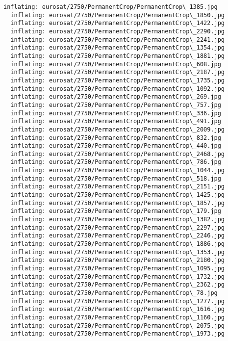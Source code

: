 \documentclass[11pt]{article}
\begin{document}
\begin{Verbatim}[commandchars=\\\{\}]
  inflating: eurosat/2750/PermanentCrop/PermanentCrop\_1385.jpg
  inflating: eurosat/2750/PermanentCrop/PermanentCrop\_1850.jpg
  inflating: eurosat/2750/PermanentCrop/PermanentCrop\_1422.jpg
  inflating: eurosat/2750/PermanentCrop/PermanentCrop\_2290.jpg
  inflating: eurosat/2750/PermanentCrop/PermanentCrop\_2241.jpg
  inflating: eurosat/2750/PermanentCrop/PermanentCrop\_1354.jpg
  inflating: eurosat/2750/PermanentCrop/PermanentCrop\_1881.jpg
  inflating: eurosat/2750/PermanentCrop/PermanentCrop\_608.jpg
  inflating: eurosat/2750/PermanentCrop/PermanentCrop\_2187.jpg
  inflating: eurosat/2750/PermanentCrop/PermanentCrop\_1735.jpg
  inflating: eurosat/2750/PermanentCrop/PermanentCrop\_1092.jpg
  inflating: eurosat/2750/PermanentCrop/PermanentCrop\_269.jpg
  inflating: eurosat/2750/PermanentCrop/PermanentCrop\_757.jpg
  inflating: eurosat/2750/PermanentCrop/PermanentCrop\_336.jpg
  inflating: eurosat/2750/PermanentCrop/PermanentCrop\_491.jpg
  inflating: eurosat/2750/PermanentCrop/PermanentCrop\_2009.jpg
  inflating: eurosat/2750/PermanentCrop/PermanentCrop\_832.jpg
  inflating: eurosat/2750/PermanentCrop/PermanentCrop\_440.jpg
  inflating: eurosat/2750/PermanentCrop/PermanentCrop\_2468.jpg
  inflating: eurosat/2750/PermanentCrop/PermanentCrop\_786.jpg
  inflating: eurosat/2750/PermanentCrop/PermanentCrop\_1044.jpg
  inflating: eurosat/2750/PermanentCrop/PermanentCrop\_518.jpg
  inflating: eurosat/2750/PermanentCrop/PermanentCrop\_2151.jpg
  inflating: eurosat/2750/PermanentCrop/PermanentCrop\_1425.jpg
  inflating: eurosat/2750/PermanentCrop/PermanentCrop\_1857.jpg
  inflating: eurosat/2750/PermanentCrop/PermanentCrop\_179.jpg
  inflating: eurosat/2750/PermanentCrop/PermanentCrop\_1382.jpg
  inflating: eurosat/2750/PermanentCrop/PermanentCrop\_2297.jpg
  inflating: eurosat/2750/PermanentCrop/PermanentCrop\_2246.jpg
  inflating: eurosat/2750/PermanentCrop/PermanentCrop\_1886.jpg
  inflating: eurosat/2750/PermanentCrop/PermanentCrop\_1353.jpg
  inflating: eurosat/2750/PermanentCrop/PermanentCrop\_2180.jpg
  inflating: eurosat/2750/PermanentCrop/PermanentCrop\_1095.jpg
  inflating: eurosat/2750/PermanentCrop/PermanentCrop\_1732.jpg
  inflating: eurosat/2750/PermanentCrop/PermanentCrop\_2362.jpg
  inflating: eurosat/2750/PermanentCrop/PermanentCrop\_78.jpg
  inflating: eurosat/2750/PermanentCrop/PermanentCrop\_1277.jpg
  inflating: eurosat/2750/PermanentCrop/PermanentCrop\_1616.jpg
  inflating: eurosat/2750/PermanentCrop/PermanentCrop\_1160.jpg
  inflating: eurosat/2750/PermanentCrop/PermanentCrop\_2075.jpg
  inflating: eurosat/2750/PermanentCrop/PermanentCrop\_1973.jpg

\end{Verbatim}
\end{document}
